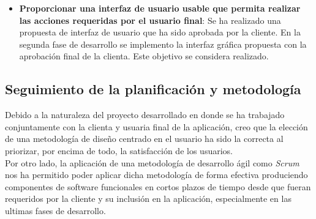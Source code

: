 \documentclass[11pt,a4paper]{article}
\begin{document}
\begin{itemize}
\item \textbf{Proporcionar una interfaz de usuario usable que permita realizar las acciones requeridas por el usuario final}: Se ha realizado una propuesta de interfaz de usuario que ha sido aprobada por la cliente. En la segunda fase de desarrollo se implemento la interfaz gráfica propuesta con la aprobación final de la clienta. Este objetivo se considera realizado.
\end{itemize}
\newpage 

\subsection{Seguimiento de la planificación y metodología}\label{sec:seguiminetoPlanificacion}
Debido a la naturaleza del proyecto desarrollado en donde se ha trabajado conjuntamente con la clienta y usuaria final de la aplicación, creo que la elección de una metodología de diseño centrado en el usuario ha sido la correcta al priorizar, por encima de todo, la satisfacción de los usuarios. 
\\

Por otro lado, la aplicación de una metodología de desarrollo ágil como \textit{Scrum} nos ha permitido poder aplicar dicha metodología de forma efectiva produciendo componentes de software funcionales en cortos plazos de tiempo desde que fueran requeridos por la cliente y su inclusión en la aplicación, especialmente en las ultimas fases de desarrollo.
\\
\end{document}
